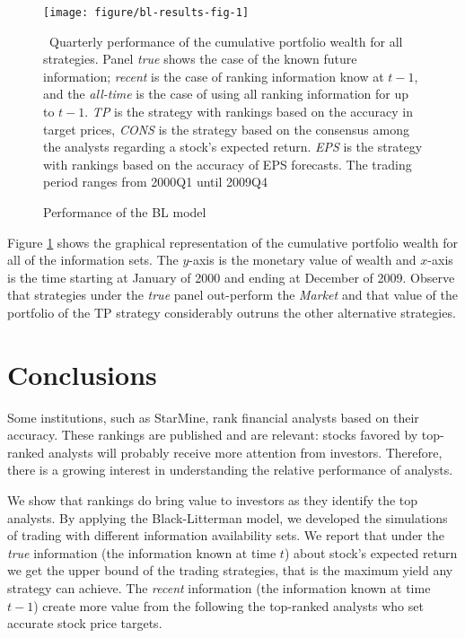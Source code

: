 \documentclass{book}
\newcommand{\tr}{\textit{true}}
\newcommand{\naive}{\textit{recent}}
\newcommand{\default}{\textit{all-time}}
\begin{document}
\begin{figure}
\begin{center}
\texttt{[image: figure/bl-results-fig-1]}
\end{center}
\caption{Performance of the BL model}
\label{fig:bl-results}
\ Quarterly performance of the cumulative portfolio wealth for all strategies. Panel \tr{} shows the case of the known future information; \naive{} is the case of ranking information know at $t-1$, and the \default{} is the case of using all ranking information for up to $t-1$. \textit{TP} is the strategy with rankings based on the accuracy in target prices, \textit{CONS} is the strategy based on the consensus among the analysts regarding a stock's expected return. \textit{EPS} is the strategy with rankings based on the accuracy of EPS forecasts. The trading period ranges from 2000Q1 until 2009Q4
\end{figure}

Figure \ref{fig:bl-results} shows the graphical representation of the cumulative portfolio wealth for all of the information sets. The $y$-axis is the monetary value of wealth and $x$-axis is the time starting at January of 2000 and ending at December of 2009. Observe that strategies under the \tr{} panel out-perform the \emph{Market} and that value of the portfolio of the TP strategy considerably outruns the other alternative strategies.

\section{Conclusions}
\label{sec:conclusion}

Some institutions, such as StarMine, rank financial analysts based on their accuracy. These rankings are published and are relevant: stocks favored by top-ranked analysts will probably receive more attention from investors. Therefore, there is a growing interest in understanding the relative performance of analysts.

We show that rankings do bring value to investors as they identify the top analysts. By applying the Black-Litterman model, we developed the simulations of trading with different information availability sets. We report that under the \tr{} information (the information known at time $t$) about stock's expected return we get the upper bound of the trading strategies, that is the maximum yield any strategy can achieve. The \naive{} information (the information known at time $t-1$) create more value from the following the top-ranked analysts who set accurate stock price targets. %
\end{document}
